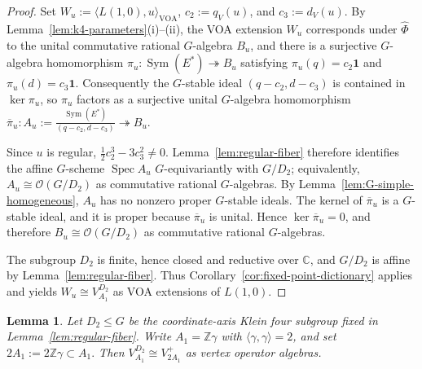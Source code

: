 \documentclass[10pt,a4paper]{amsart}
\numberwithin{equation}{section} \newtheorem{thm}{Theorem}[section] \newtheorem{lem}[thm]{Lemma} \newtheorem{ex}[thm]{Example} \newtheorem{prop}[thm]{Proposition} \newtheorem{cor}[thm]{Corollary} \newtheorem{defi}[thm]{Definition} \newtheorem{rmk}[thm]{Remark} \newtheorem{notation}[thm]{Notation}
\newcommand{\one}{\mathbf{1}}
\newcommand{\Sym}{\operatorname{Sym}}
\newcommand{\Spec}{\operatorname{Spec}}
\newcommand{\OO}{\mathcal O}
\def\Z{\mathbb{Z}} \def\N{\mathbb{N}} \def\A{\mathbb{A}} \def\C{\mathbb{C}} \def\R{\mathbb{R}} \def\Q{\mathbb{Q}} \def\F{\mathbb{F}}
\begin{document}
\begin{proof}
Set \(W_u:=\langle L(1,0),u\rangle_{\mathrm{VOA}}\), \(c_2:=q_V(u)\), and \(c_3:=d_V(u)\). By Lemma~\ref{lem:k4-parameters}\textnormal{(i)--(ii)}, the VOA extension $W_u$ corresponds under $\widehat\Phi$ to the unital commutative rational $G$-algebra $B_u$, and there is a surjective $G$-algebra homomorphism \(\pi_u:\Sym(E^*)\twoheadrightarrow B_u\) satisfying \(\pi_u(q)=c_2\one\) and \(\pi_u(d)=c_3\one\). Consequently the $G$-stable ideal \((q-c_2,d-c_3)\) is contained in $\ker\pi_u$, so $\pi_u$ factors as a surjective unital $G$-algebra homomorphism \(\overline\pi_u: A_u:=\frac{\Sym(E^*)}{(q-c_2,d-c_3)}\twoheadrightarrow B_u.\)

Since $u$ is regular, \(\frac12c_2^3-3c_3^2\ne0\). Lemma~\ref{lem:regular-fiber} therefore identifies the affine $G$-scheme $\Spec A_u$ $G$-equivariantly with $G/D_2$; equivalently, \(A_u\cong\OO(G/D_2)\) as commutative rational $G$-algebras. By Lemma~\ref{lem:G-simple-homogeneous}, $A_u$ has no nonzero proper $G$-stable ideals. The kernel of $\overline\pi_u$ is a $G$-stable ideal, and it is proper because $\overline\pi_u$ is unital. Hence \(\ker\overline\pi_u=0\), and therefore \(B_u\cong\OO(G/D_2)\) as commutative rational $G$-algebras.

The subgroup $D_2$ is finite, hence closed and reductive over $\C$, and $G/D_2$ is affine by Lemma~\ref{lem:regular-fiber}. Thus Corollary~\ref{cor:fixed-point-dictionary} applies and yields \(W_u\cong V_{A_1}^{D_2}\) as VOA extensions of $L(1,0)$.
\end{proof}

\begin{lem}\label{lem:D2-lattice}
Let $D_2\le G$ be the coordinate-axis Klein four subgroup fixed in Lemma~\ref{lem:regular-fiber}. Write $A_1=\Z\gamma$ with $\langle\gamma,\gamma\rangle=2$, and set \(2A_1:=2\Z\gamma\subset A_1.\) Then \(V_{A_1}^{D_2}\cong V_{2A_1}^+\) as vertex operator algebras.
\end{lem}
\end{document}
